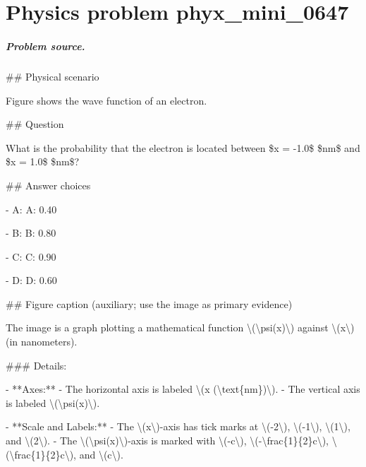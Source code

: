 
\chapter{Physics problem phyx\_mini\_0647}
\label{ch:PhyXMiniProblems_problem_phyx_mini_0647}

\paragraph{Problem source.}
\#\# Physical scenario

Figure shows the wave function of an electron.

\#\# Question

What is the probability that the electron is located between \$x = -1.0\$ \$nm\$ and \$x = 1.0\$ \$nm\$?

\#\# Answer choices

- A: A: 0.40

- B: B: 0.80

- C: C: 0.90

- D: D: 0.60

\#\# Figure caption (auxiliary; use the image as primary evidence)

The image is a graph plotting a mathematical function \textbackslash{}(\textbackslash{}psi(x)\textbackslash{}) against \textbackslash{}(x\textbackslash{}) (in nanometers). 

\#\#\# Details:

- **Axes:**
  - The horizontal axis is labeled \textbackslash{}(x (\textbackslash{}text\{nm\})\textbackslash{}).
  - The vertical axis is labeled \textbackslash{}(\textbackslash{}psi(x)\textbackslash{}).

- **Scale and Labels:**
  - The \textbackslash{}(x\textbackslash{})-axis has tick marks at \textbackslash{}(-2\textbackslash{}), \textbackslash{}(-1\textbackslash{}), \textbackslash{}(1\textbackslash{}), and \textbackslash{}(2\textbackslash{}).
  - The \textbackslash{}(\textbackslash{}psi(x)\textbackslash{})-axis is marked with \textbackslash{}(-c\textbackslash{}), \textbackslash{}(-\textbackslash{}frac\{1\}\{2\}c\textbackslash{}), \textbackslash{}(\textbackslash{}frac\{1\}\{2\}c\textbackslash{}), and \textbackslash{}(c\textbackslash{}).

